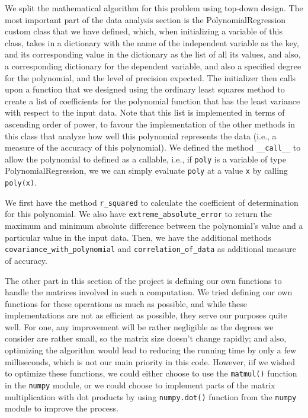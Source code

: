 \documentclass[12pt]{article}
\begin{document}
\begin{enumerate}
\begin{text}
We split the mathematical algorithm for this problem using top-down design. The most important part of the data analysis section is the PolynomialRegression custom class that we have defined, which, when initializing a variable of this class, takes in a dictionary with the name of the independent variable as the key, and its corresponding value in the dictionary as the list of all its values, and also, a corresponding dictionary for the dependent variable, and also a specified degree for the polynomial, and the level of precision expected. The initializer then calls upon a function that we designed using the ordinary least squares method to create a list of coefficients for the polynomial function that has the least variance with respect to the input data. Note that this list is implemented in terms of ascending order of power, to favour the implementation of the other methods in this class that analyze how well this polynomial represents the data (i.e., a measure of the accuracy of this polynomial). We defined the method \texttt{\_\_call\_\_} to allow the polynomial to defined as a callable, i.e., if \texttt{poly} is a variable of type PolynomialRegression, we we can simply evaluate \texttt{poly} at a value \texttt{x} by calling \texttt{poly(x)}.

We first have the method \texttt{r\_squared} to calculate the coefficient of determination for this polynomial. We also have \texttt{extreme\_absolute\_error} to return the maximum and minimum absolute difference between the polynomial's value and a particular value in the input data. Then, we have the additional methods \texttt{covariance\_with\_polynomial} and \texttt{correlation\_of\_data} as additional measure of accuracy.

The other part in this section of the project is defining our own functions to handle the matrices involved in such a computation. We tried defining our own functions for these operations as much as possible, and while these implementations are not as efficient as possible, they serve our purposes quite well. For one, any improvement will be rather negligible as the degrees we consider are rather small, so the matrix size doesn't change rapidly; and also, optimizing the algorithm would lead to reducing the running time by only a few milliseconds, which is not our main priority in this code. However, iif we wished to optimize these functions, we could either choose to use the \texttt{matmul()} function in the \texttt{numpy} module, or we could choose to implement parts of the matrix multiplication with dot products by using \texttt{numpy.dot()} function from the \texttt{numpy} module to improve the process.


\end{text}
\end{enumerate}
\end{document}
